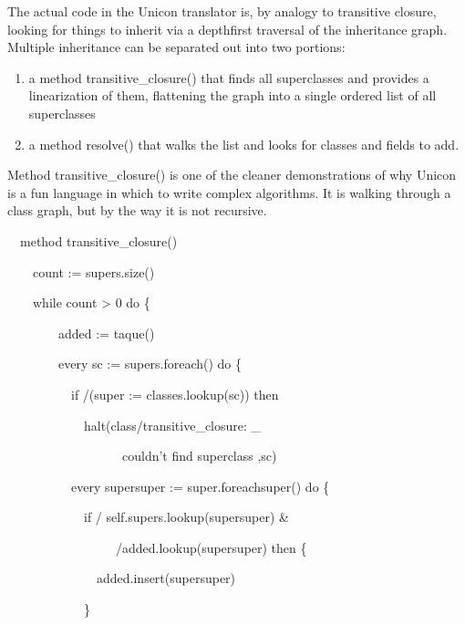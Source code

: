 The actual code in the Unicon translator is, by analogy to transitive
closure, looking for things to inherit via a depthfirst traversal of
the inheritance graph. Multiple inheritance can be separated out into
two portions:

\liststyleLxliii
\begin{enumerate}

\item a method transitive\_closure() that finds all superclasses and
provides a linearization of them, flattening the graph into a single
ordered list of all superclasses

\item a method resolve() that walks the list and looks for classes and
fields to add.

\end{enumerate}

Method transitive\_closure() is one of the cleaner demonstrations of
why Unicon is a fun language in which to write complex algorithms. It
is walking through a class graph, but by the way it is not recursive.

{\ttfamily\mdseries
\ \ method transitive\_closure()}

{\ttfamily\mdseries
\ \ \ \ count := supers.size()}

{\ttfamily\mdseries
\ \ \ \ while count {\textgreater} 0 do \{}

{\ttfamily\mdseries
\ \ \ \ \ \ \ \ added := taque()}

{\ttfamily\mdseries
\ \ \ \ \ \ \ \ every sc := supers.foreach() do \{}

{\ttfamily\mdseries
\ \ \ \ \ \ \ \ \ \ if /(super := classes.lookup(sc)) then}

{\ttfamily\mdseries
\ \ \ \ \ \ \ \ \ \ \ \ halt({\textquotedbl}class/transitive\_closure: \_}

{\ttfamily\mdseries
\ \ \ \ \ \ \ \ \ \ \ \ \ \ \ \ \ \ couldn't find superclass {\textquotedbl},sc)}

{\ttfamily\mdseries
\ \ \ \ \ \ \ \ \ \ every supersuper := super.foreachsuper() do \{}

{\ttfamily\mdseries
\ \ \ \ \ \ \ \ \ \ \ \ if / self.supers.lookup(supersuper) \&}

{\ttfamily\mdseries
\ \ \ \ \ \ \ \ \ \ \ \ \ \ \ \ \ /added.lookup(supersuper) then \{}

{\ttfamily\mdseries
\ \ \ \ \ \ \ \ \ \ \ \ \ \ added.insert(supersuper)}

{\ttfamily\mdseries
\ \ \ \ \ \ \ \ \ \ \ \ \}}

